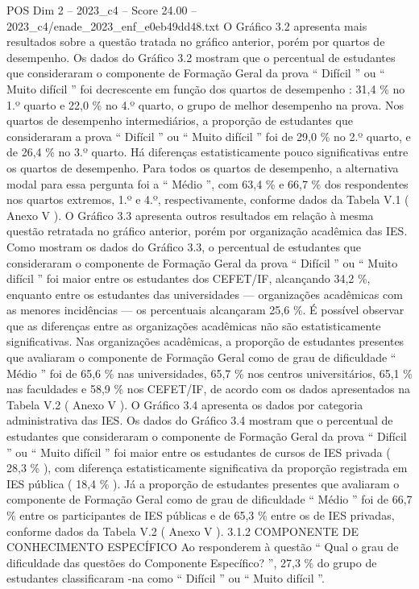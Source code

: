 \begin{textsample}{POS Dim 2 – 2023\_c4 – Score 24.00 – 2023\_c4/enade\_2023\_enf\_e0eb49dd48.txt}
O Gráfico 3.2 apresenta mais resultados sobre a questão tratada no gráfico anterior, porém por quartos de desempenho.
Os dados do Gráfico 3.2 mostram que o percentual de estudantes que consideraram o componente de Formação Geral da prova “ Difícil ” ou “ Muito difícil ” foi decrescente em função dos quartos de desempenho : 31,4 \% no 1.º quarto e 22,0 \% no 4.º quarto, o grupo de melhor desempenho na prova.
Nos quartos de desempenho intermediários, a proporção de estudantes que consideraram a prova “ Difícil ” ou “ Muito difícil ” foi de 29,0 \% no 2.º quarto, e de 26,4 \% no 3.º quarto.
Há diferenças estatisticamente pouco significativas entre os quartos de desempenho.
Para todos os quartos de desempenho, a alternativa modal para essa pergunta foi a “ Médio ”, com 63,4 \% e 66,7 \% dos respondentes nos quartos extremos, 1.º e 4.º, respectivamente, conforme dados da Tabela V.1 ( Anexo V ).
O Gráfico 3.3 apresenta outros resultados em relação à mesma questão retratada no gráfico anterior, porém por organização acadêmica das IES.
Como mostram os dados do Gráfico 3.3, o percentual de estudantes que consideraram o componente de Formação Geral da prova “ Difícil ” ou “ Muito difícil ” foi maior entre os estudantes dos CEFET/IF, alcançando 34,2 \%, enquanto entre os estudantes das universidades — organizações acadêmicas com as menores incidências — os percentuais alcançaram 25,6 \%.
É possível observar que as diferenças entre as organizações acadêmicas não são estatisticamente significativas.
Nas organizações acadêmicas, a proporção de estudantes presentes que avaliaram o componente de Formação Geral como de grau de dificuldade “ Médio ” foi de 65,6 \% nas universidades, 65,7 \% nos centros universitários, 65,1 \% nas faculdades e 58,9 \% nos CEFET/IF, de acordo com os dados apresentados na Tabela V.2 ( Anexo V ).
O Gráfico 3.4 apresenta os dados por categoria administrativa das IES.
Os dados do Gráfico 3.4 mostram que o percentual de estudantes que consideraram o componente de Formação Geral da prova “ Difícil ” ou “ Muito difícil ” foi maior entre os estudantes de cursos de IES privada ( 28,3 \% ), com diferença estatisticamente significativa da proporção registrada em IES pública ( 18,4 \% ).
Já a proporção de estudantes presentes que avaliaram o componente de Formação Geral como de grau de dificuldade “ Médio ” foi de 66,7 \% entre os participantes de IES públicas e de 65,3 \% entre os de IES privadas, conforme dados da Tabela V.2 ( Anexo V ). 3.1.2 COMPONENTE DE CONHECIMENTO ESPECÍFICO Ao responderem à questão “ Qual o grau de dificuldade das questões do Componente Específico? ”, 27,3 \% do grupo de estudantes classificaram -na como “ Difícil ” ou “ Muito difícil ”.

\end{textsample}
